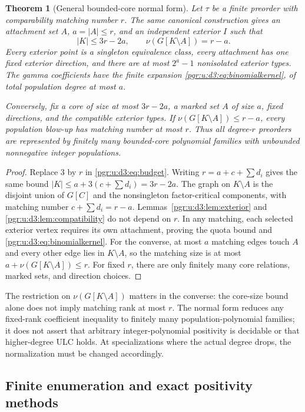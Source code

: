 \documentclass[11pt]{article}
\numberwithin{equation}{section}
\newtheorem{theorem}{Theorem}[section]\newtheorem{lemma}[theorem]{Lemma}\newtheorem{proposition}[theorem]{Proposition}\newtheorem{corollary}[theorem]{Corollary}
\theoremstyle{definition}\newtheorem{definition}[theorem]{Definition}\newtheorem{remark}[theorem]{Remark}
\begin{document}
\begin{theorem}[General bounded-core normal form]\label{pgr:u:d3:thm:normalform}
Let $\tau$ be a finite preorder with comparability matching number $r$. The same canonical construction gives an attachment set $A$, $a=|A|\le r$, and an independent exterior $I$ such that
\[
 |K|\le3r-2a,\qquad \nu(G[K\setminus A])=r-a.
\]
Every exterior point is a singleton equivalence class, every attachment has one fixed exterior direction, and there are at most $2^a-1$ nonisolated exterior types. The gamma coefficients have the finite expansion \eqref{pgr:u:d3:eq:binomialkernel}, of total population degree at most $a$.

Conversely, fix a core of size at most $3r-2a$, a marked set $A$ of size $a$, fixed directions, and the compatible exterior types. If $\nu(G[K\setminus A])\le r-a$, every population blow-up has matching number at most $r$. Thus all degree-$r$ preorders are represented by finitely many bounded-core polynomial families with unbounded nonnegative integer populations.
\end{theorem}
\begin{proof}
Replace $3$ by $r$ in \eqref{pgr:u:d3:eq:budget}. Writing $r=a+c+\sum d_i$ gives the same bound $|K|\le a+3(c+\sum d_i)=3r-2a$. The graph on $K\setminus A$ is the disjoint union of $G[C]$ and the nonsingleton factor-critical components, with matching number $c+\sum d_i=r-a$. Lemmas~\ref{pgr:u:d3:lem:exterior} and \ref{pgr:u:d3:lem:compatibility} do not depend on $r$. In any matching, each selected exterior vertex requires its own attachment, proving the quota bound and \eqref{pgr:u:d3:eq:binomialkernel}. For the converse, at most $a$ matching edges touch $A$ and every other edge lies in $K\setminus A$, so the matching size is at most $a+\nu(G[K\setminus A])\le r$. For fixed $r$, there are only finitely many core relations, marked sets, and direction choices.
\end{proof}

The restriction on $\nu(G[K\setminus A])$ matters in the converse: the core-size bound alone does not imply matching rank at most $r$. The normal form reduces any fixed-rank coefficient inequality to finitely many population-polynomial families; it does not assert that arbitrary integer-polynomial positivity is decidable or that higher-degree ULC holds. At specializations where the actual degree drops, the normalization must be changed accordingly.

\subsection{Finite enumeration and exact positivity methods}\label{pgr:u:d3:sec:methods}
\end{document}
